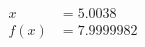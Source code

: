 \documentclass[preview]{standalone}
\begin{document}
\begin{align*}
x &= 5.0038\\f(x) &= 7.9999982
\end{align*}
\end{document}
